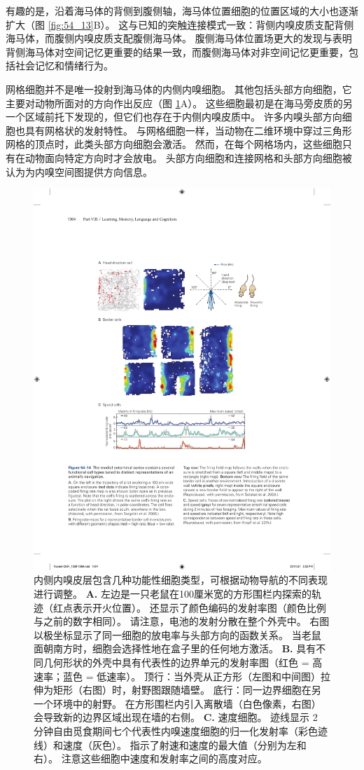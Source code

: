 有趣的是，沿着海马体的背侧到腹侧轴，海马体位置细胞的位置区域的大小也逐渐扩大（图 \ref{fig:54_13}B）。
这与已知的突触连接模式一致：背侧内嗅皮质支配背侧海马体，而腹侧内嗅皮质支配腹侧海马体。
腹侧海马体位置场更大的发现与表明背侧海马体对空间记忆更重要的结果一致，而腹侧海马体对非空间记忆更重要，包括社会记忆和情绪行为。


网格细胞并不是唯一投射到海马体的内侧内嗅细胞。
其他包括头部方向细胞，它主要对动物所面对的方向作出反应（图 \ref{fig:54_14}A）。
这些细胞最初是在海马旁皮质的另一个区域前托下发现的，但它们也存在于内侧内嗅皮质中。
许多内嗅头部方向细胞也具有网格状的发射特性。
与网格细胞一样，当动物在二维环境中穿过三角形网格的顶点时，此类头部方向细胞会激活。
然而，在每个网格场内，这些细胞只有在动物面向特定方向时才会放电。
头部方向细胞和连接网格和头部方向细胞被认为为内嗅空间图提供方向信息。


\begin{figure}[htbp]
	\centering
	\includegraphics[width=0.7\linewidth]{chap54/fig_54_14}
	\caption{内侧内嗅皮层包含几种功能性细胞类型，可根据动物导航的不同表现进行调整。
		\textbf{A.} 左边是一只老鼠在100厘米宽的方形围栏内探索的轨迹（红点表示开火位置）。
		还显示了颜色编码的发射率图（颜色比例与之前的数字相同）。 请注意，电池的发射分散在整个外壳中。
		右图以极坐标显示了同一细胞的放电率与头部方向的函数关系。
		当老鼠面朝南方时，细胞会选择性地在盒子里的任何地方激活\cite{sargolini2006conjunctive}。
		\textbf{B.} 具有不同几何形状的外壳中具有代表性的边界单元的发射率图（红色 = 高速率；蓝色 = 低速率）。
		顶行：当外壳从正方形（左图和中间图）拉伸为矩形（右图）时，射野图跟随墙壁。
		底行：同一边界细胞在另一个环境中的射野。
		在方形围栏内引入离散墙（白色像素，右图）会导致新的边界区域出现在墙的右侧\cite{solstad2008representation}。
		\textbf{C.} 速度细胞。
		迹线显示 2 分钟自由觅食期间七个代表性内嗅速度细胞的归一化发射率（彩色迹线）和速度（灰色）。
		指示了射速和速度的最大值（分别为左和右）。
		注意这些细胞中速度和发射率之间的高度对应\cite{kropff2015speed}。}
	\label{fig:54_14}
\end{figure}


